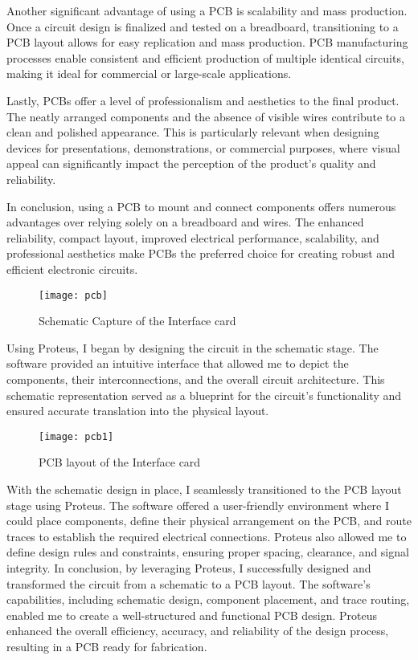 Another significant advantage of using a PCB is scalability and mass production. Once a circuit design is finalized and tested on a breadboard, transitioning to a PCB layout allows for easy replication and mass production. PCB manufacturing processes enable consistent and efficient production of multiple identical circuits, making it ideal for commercial or large-scale applications.

Lastly, PCBs offer a level of professionalism and aesthetics to the final product. The neatly arranged components and the absence of visible wires contribute to a clean and polished appearance. This is particularly relevant when designing devices for presentations, demonstrations, or commercial purposes, where visual appeal can significantly impact the perception of the product's quality and reliability.

In conclusion, using a PCB to mount and connect components offers numerous advantages over relying solely on a breadboard and wires. The enhanced reliability, compact layout, improved electrical performance, scalability, and professional aesthetics make PCBs the preferred choice for creating robust and efficient electronic circuits.
\begin{figure}[h]
\FloatBarrier
         \centering
        \texttt{[image: pcb]}
   
        \caption{Schematic Capture of the Interface card}
        \label{Schematic Capture of the Interface card}
\FloatBarrier
    \end{figure}
\FloatBarrier
Using Proteus, I began by designing the circuit in the schematic stage. The software provided an intuitive interface that allowed me to depict the components, their interconnections, and the overall circuit architecture. This schematic representation served as a blueprint for the circuit's functionality and ensured accurate translation into the physical layout.
\begin{figure}[h]
\FloatBarrier
         \centering
        \texttt{[image: pcb1]}
   
        \caption{PCB layout of the Interface card}
        \label{PCB layout of the Interface card}
\FloatBarrier
    \end{figure}
\FloatBarrier

With the schematic design in place, I seamlessly transitioned to the PCB layout stage using Proteus. The software offered a user-friendly environment where I could place components, define their physical arrangement on the PCB, and route traces to establish the required electrical connections. Proteus also allowed me to define design rules and constraints, ensuring proper spacing, clearance, and signal integrity.
In conclusion, by leveraging Proteus, I successfully designed and transformed the circuit from a schematic to a PCB layout. The software's capabilities, including schematic design, component placement, and trace routing, enabled me to create a well-structured and functional PCB design. Proteus enhanced the overall efficiency, accuracy, and reliability of the design process, resulting in a PCB ready for fabrication.

